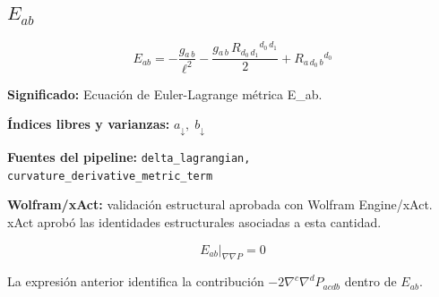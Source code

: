 \documentclass[11pt]{article}
\begin{document}
\subsection*{$ E_{ab} $}
\begin{dmath*}[breakdepth={5}]
E_{ab} = -\frac{g{}_{a\,b}}{{\ell}^{2}} - \frac{g{}_{a\,b}\,R{}_{d_{0}\,d_{1}}{}^{d_{0}\,d_{1}}}{2} + R{}_{a\,d_{0}\,b}{}^{d_{0}}
\end{dmath*}
\par\vspace{1.2\baselineskip}\noindent
\begin{minipage}{\linewidth}
\textbf{Significado:} Ecuación de Euler-Lagrange métrica E\_ab.\par
\textbf{Índices libres y varianzas:} $ a_{\downarrow},\;b_{\downarrow} $\par
\textbf{Fuentes del pipeline:} \texttt{delta\_lagrangian, curvature\_derivative\_metric\_term}\par
\textbf{Wolfram/xAct:} validación estructural aprobada con Wolfram Engine/xAct. xAct aprobó las identidades estructurales asociadas a esta cantidad.\par
\end{minipage}
\begin{dmath*}[breakdepth={5}]
\left.E_{ab}\right|_{\nabla\nabla P} = 0
\end{dmath*}
\par\vspace{0.8\baselineskip}\noindent
\begin{minipage}{\linewidth}
La expresión anterior identifica la contribución $-2\nabla^c\nabla^dP_{acdb}$ dentro de $E_{ab}$.\par
\end{minipage}
\end{document}
